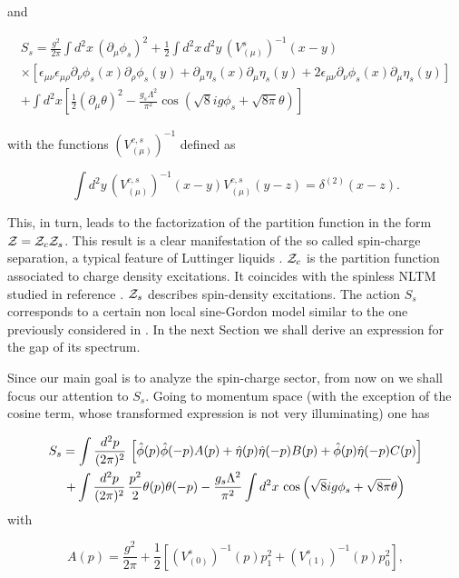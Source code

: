 \documentclass[a4paper,a4paper]{article}
\begin{document}
\noindent and

\begin{multline}\label{eq:SpinAction}
S_s=\frac{g^2}{2\pi}\int d^2x\,(\partial_\mu\phi_s)^2
+\frac{1}{2}\int d^2x\,d^2y\,\left(V^s_{(\mu)}\right)^{-1}(x-y)\\
\times\left[\epsilon_{\mu\nu}\epsilon_{\mu\rho}\partial_\nu\phi_s(x)\partial_\rho\phi_s(y)
+\partial_\mu\eta_s(x)\partial_\mu\eta_s(y) +
2\epsilon_{\mu\nu}\partial_\nu\phi_s(x)\partial_\mu\eta_s(y)\right]\\
+\int d^2x\left[\frac{1}{2}(\partial_\mu\theta)^2
-\frac{g_s\Lambda^2}{\pi^2}
\cos\left(\sqrt{8}ig\phi_s+\sqrt{8\pi}\theta\right)\right]
\end{multline}

\noindent with the functions $\left(V^{c,s}_{(\mu)}\right)^{-1}$ defined as

\begin{equation}
\int d^2y\,\left(V^{c,s}_{(\mu)}\right)^{-1}(x-y)
V^{c,s}_{(\mu)}(y-z) = \delta^{(2)}(x-z).
\end{equation}

This, in turn, leads to the factorization of the partition function in the form
$\mathcal{Z}=\mathcal{Z}_c \mathcal{Z}_s$. This result is a clear manifestation of the so called spin-charge
separation, a typical feature of Luttinger liquids \cite{Luther-Emery} \cite{GMR}.
$\mathcal{Z}_c$ is the partition function associated to charge density excitations. It
coincides with the spinless NLTM studied in reference \cite{NLT1}. $\mathcal{Z}_s$ describes
spin-density excitations. The action $S_s$ corresponds to a certain non local
sine-Gordon model similar to the one previously considered in \cite{Li-Naon}. In the
next Section we shall derive an expression for the gap of its spectrum.

Since our main goal is to analyze the spin-charge sector, from now on we shall focus
our attention to $S_s$. Going to momentum space (with the exception of the cosine
term, whose transformed expression is not very illuminating) one has

\begin{multline}
S_s=\int\frac{d^2p}{(2\pi)^2}\,\left[\hat{\phi}(p)\hat{\phi}(-p)A(p)+\hat{\eta}(p)\hat{\eta}(-p)B(p) +
\hat{\phi}(p)\hat{\eta}(-p)C(p)\right]\\+\int\frac{d^2p}{(2\pi)^2}\,\frac{p^2}{2}\theta(p)\theta(-p)
-\frac{g_s\Lambda^2}{\pi^2}\int d^2x\,
\cos\left(\sqrt{8}ig\phi_s+\sqrt{8\pi}\theta\right)
\end{multline}
with

\begin{equation}\label{eq:A}
A(p)=\frac{g^2}{2\pi} +\frac{1}{2}\left[\left(V^s_{(0)}\right)^{-1}(p)p_1^2
+\left(V^s_{(1)}\right)^{-1}(p)p_0^2\right],
\end{equation}
\end{document}
